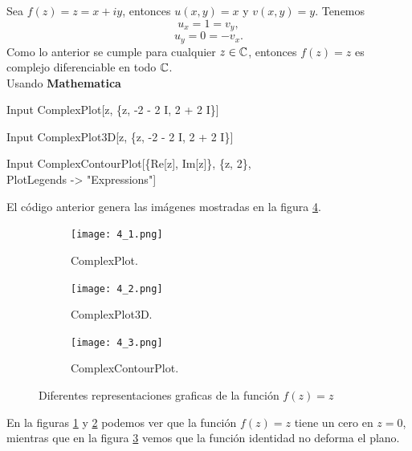 \begin{Ejem}
	Sea $f(z)=z=x+iy$, entonces $u(x,y)=x$ y $v(x,y)=y$. Tenemos
	$$u_x=1=v_y,$$
	$$u_y=0=-v_x.$$
	Como lo anterior se cumple para cualquier $z\in \mathbb{C}$, entonces $f(z)=z$ es complejo diferenciable en todo $\mathbb{C}$.\\
	Usando \textbf{Mathematica}
	\begin{mmaCell}{Input}
		ComplexPlot[z, \{z, -2 - 2 I, 2 + 2 I\}]
	\end{mmaCell}

	\begin{mmaCell}{Input}
		ComplexPlot3D[z, \{z, -2 - 2 I, 2 + 2 I\}]
	\end{mmaCell}

	\begin{mmaCell}{Input}
		ComplexContourPlot[\{Re[z], Im[z]\}, \{z, 2\},\\PlotLegends -> "Expressions"]
	\end{mmaCell}
El código anterior genera las imágenes mostradas en la figura \ref{fig:ej_4}.\\	
	\begin{figure}[htbp!]
		\centering
		\begin{subfigure}{0.25\textwidth}
			\texttt{[image: 4\_1.png]}
			\caption{ComplexPlot.}
			\label{fig:ej_4_1}
		\end{subfigure}
		\begin{subfigure}{0.25\textwidth}
			\texttt{[image: 4\_2.png]}
			\caption{ComplexPlot3D.}
			\label{fig:ej_4_2}
		\end{subfigure}
		\begin{subfigure}{0.25\textwidth}
			\texttt{[image: 4\_3.png]}
			\caption{ComplexContourPlot.}
			\label{fig:ej_4_3}
		\end{subfigure}
		\caption{Diferentes representaciones graficas de la función $f(z)=z$}
		\label{fig:ej_4}
	\end{figure}

\noindent En la figuras \ref{fig:ej_4_1} y \ref{fig:ej_4_2} podemos ver que la función $f(z)=z$ tiene un cero en $z=0$, mientras que en la figura \ref{fig:ej_4_3} vemos que la función identidad no deforma el plano.
\end{Ejem} 


